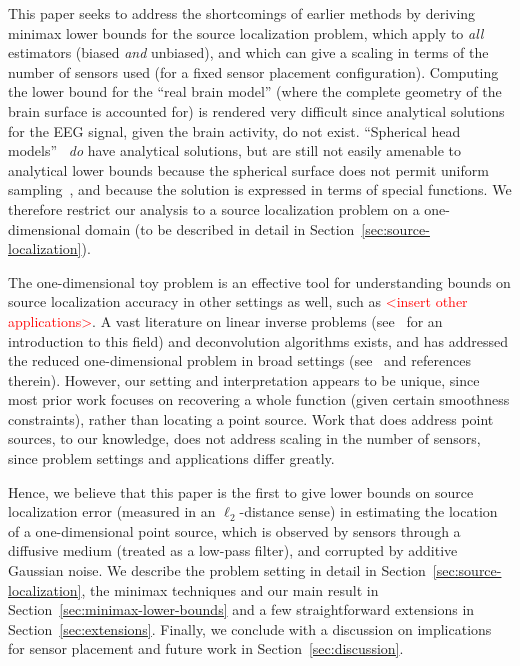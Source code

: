 \documentclass[conference]{IEEEtran}
\begin{document}
This paper seeks to address the shortcomings of earlier methods by deriving
minimax lower bounds for the source localization problem, which apply to
\emph{all} estimators (biased \emph{and} unbiased), and which can give a
scaling in terms of the number of sensors used (for a fixed sensor placement
configuration). Computing the lower bound for the ``real brain model'' (where
the complete geometry of the brain surface is accounted for) is rendered very
difficult since analytical solutions for the EEG signal, given the brain
activity, do not exist. ``Spherical head
models''~\cite{Nunez2006Electric,Grover2016Information} \emph{do} have
analytical solutions, but are still not easily amenable to analytical lower
bounds because the spherical surface does not permit uniform
sampling~\cite{Heath1956Thirteen}, and because the solution is expressed in
terms of special functions. We therefore restrict our analysis to a source
localization problem on a one-dimensional domain (to be described in detail in
Section~\ref{sec:source-localization}).

The one-dimensional toy problem is an effective tool for understanding bounds
on source localization accuracy in other settings as well, such as
\textcolor{red}{<insert other applications>}. A vast literature on linear
inverse problems (see~\cite{Bal2012Introduction} for an introduction to this
field) and deconvolution algorithms exists, and has addressed the reduced
one-dimensional problem in broad settings
(see~\cite{Cavalier2002Sharp,Efromovich1997Robust,Ibragimov1981Statistical} and
references therein). However, our setting and interpretation appears to be
unique, since most prior work focuses on recovering a whole function (given
certain smoothness constraints), rather than locating a point source. Work that
does address point sources, to our knowledge, does not address scaling in the
number of sensors, since problem settings and applications differ greatly.

Hence, we believe that this paper is the first to give lower bounds on source
localization error (measured in an $\ell_2$-distance sense) in estimating the
location of a one-dimensional point source, which is observed by sensors
through a diffusive medium (treated as a low-pass filter), and corrupted by
additive Gaussian noise. We describe the problem setting in detail in
Section~\ref{sec:source-localization}, the minimax techniques and our main
result in Section~\ref{sec:minimax-lower-bounds} and a few straightforward
extensions in Section~\ref{sec:extensions}. Finally, we conclude with a
discussion on implications for sensor placement and future work in
Section~\ref{sec:discussion}.
\end{document}
